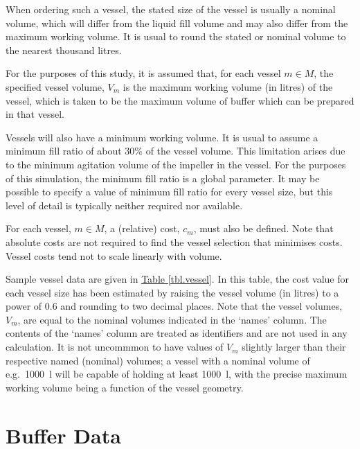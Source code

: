When ordering such a vessel, the stated size of the vessel is usually a nominal
volume, which will differ from the liquid fill volume and may also differ from
the maximum working volume.
It is usual to round the stated or nominal volume to the nearest thousand
litres.

For the purposes of this study, it is assumed that, for each vessel $m \in M$,
the specified vessel volume, $V_{m}$ is the maximum working volume (in litres)
of the vessel, which is taken to be the maximum volume of buffer which can be
prepared in that vessel.

Vessels will also have a minimum working volume.
It is usual to assume a minimum fill ratio of about 30\% of the vessel volume.
This limitation arises due to the minimum agitation volume of the impeller in
the vessel.
For the purposes of this simulation, the minimum fill ratio is a global
parameter.
It may be possible to specify a value of minimum fill ratio for every vessel
size, but this level of detail is typically neither required nor available.

For each vessel, $m \in M$, a (relative) cost, $c_{m}$, must also be defined.
Note that absolute costs are not required to find the vessel selection that
minimises costs.
Vessel costs tend not to scale linearly with volume.

Sample vessel data are given in \hyperref[tbl.vessel]{Table \ref*{tbl.vessel}}.
In this table, the cost value for each vessel size has been estimated by
raising the vessel volume (in litres) to a power of 0.6 and rounding to two
decimal places.
Note that the vessel volumes, $V_{m}$, are equal to the nominal volumes
indicated in the `names' column.  The contents of the `names' column are
treated as identifiers and are not used in any calculation.
It is not uncommmon to have values of $V_{m}$ slightly larger than their
respective named (nominal) volumes; a vessel with a nominal volume of e.g.\
\SI{1000}{\litre} will be capable of holding at least \SI{1000}{\litre}, with
the precise maximum working volume being a function of the vessel geometry.

\section{Buffer Data}\label{S.bufferdata}

